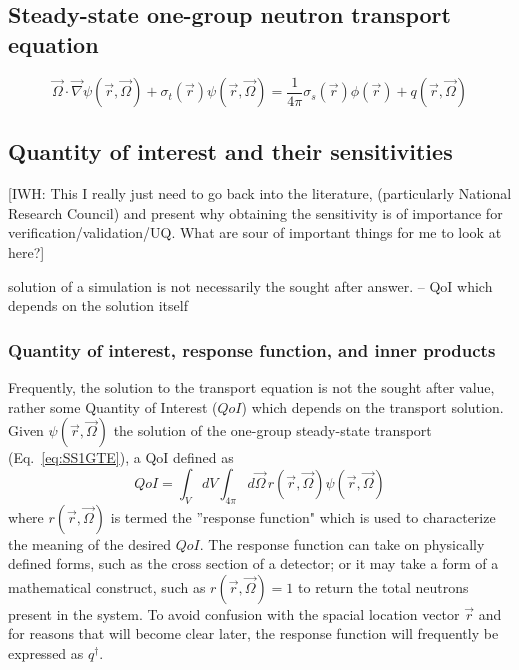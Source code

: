 \documentclass{article}
\newcommand{\vr}{\vec{r}}
\newcommand{\vO}{\vec{\Omega}}
\newcommand{\vgrad}{\vec{\nabla}}
\newcommand{\sigt}{\sigma_t}
\newcommand{\sigs}{\sigma_s}
\newcommand{\qoi}{QoI}
\begin{document}
\subsection{Steady-state one-group neutron transport equation}


\begin{equation}
\label{SS1GTE}
\vO \cdot \vgrad \psi(\vr,\vO) + \sigt(\vr) \psi(\vr,\vO) = \frac{1}{4 \pi} \sigs(\vr) \phi(\vr) + q(\vr,\vO) 
\end{equation}
\subsection{Quantity of interest and their sensitivities}

{\color{red}[IWH: This I really just need to go back into the literature, (particularly National Research Council) and present why obtaining the sensitivity is of importance for verification/validation/UQ. What are sour of important things for me to look at here?]}

solution of a simulation is not necessarily the sought after answer. -- QoI which depends on the solution itself

\subsubsection{Quantity of interest, response function, and inner products}
Frequently, the solution to the transport equation is not the sought after value, rather some Quantity of Interest ($\qoi$) which depends on the transport solution. Given $\psi(\vr,\vO)$ the solution of the one-group steady-state transport (Eq.~\eqref{eq:SS1GTE}), a QoI
defined as
\begin{equation}
\qoi =  \int_V dV \int_{4 \pi} d \vO \,  r(\vr, \vO) \psi(\vr, \vO)
\end{equation}
where $ r(\vr, \vO)$ is termed the ''response function" which is used to characterize the meaning of the desired $\qoi$. The response function can take on physically defined forms, such as the cross section of a detector; or it may take a form of a mathematical construct, such as $r(\vr, \vO)=1$ to return the total neutrons present in the system. To avoid confusion with the spacial location vector $\vr$ and for reasons that will become clear later, the response function will frequently be expressed as $q^\dag$.
\end{document}
